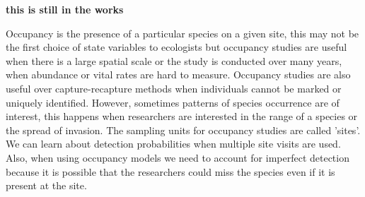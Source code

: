 \documentclass[12pt]{article}\usepackage[]{graphicx}\usepackage[]{color}
\begin{document}
\textbf{this is still in the works}

Occupancy is the presence of a particular species on a given site, this may not be the first choice of state variables to ecologists but occupancy studies are useful when there is a large spatial scale or the study is conducted over many years, when abundance or vital rates are hard to measure. Occupancy studies are also useful over capture-recapture methods when individuals cannot be marked or uniquely identified. However, sometimes patterns of species occurrence are of interest, this happens when researchers are interested in the range of a species or the spread of invasion. The sampling units for occupancy studies are called 'sites'. We can learn about detection probabilities when multiple site visits are used. Also, when using occupancy models we need to account for imperfect detection because it is possible that the researchers could miss the species even if it is present at the site. 
\end{document}
